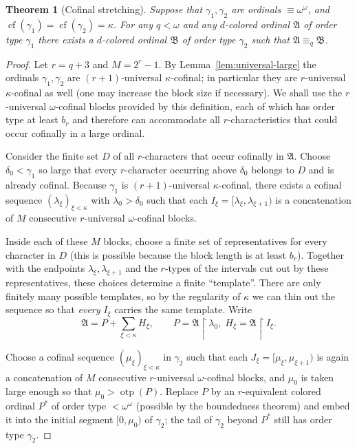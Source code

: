 \documentclass{amsart}
\newcommand{\cf}{\operatorname{cf}}
\newtheorem{theorem}{Theorem}
\theoremstyle{definition}
\begin{document}
\begin{theorem}[Cofinal stretching]\label{lem:cofinal-stretching}
    Suppose that $\gamma_1,\gamma_2$ are ordinals $\equiv\omega^\omega$, and $\cf(\gamma_1)=\cf(\gamma_2)=\kappa$. For any $q<\omega$ and any $d$-colored ordinal $\mathfrak{A}$ of order type $\gamma_1$ there exists a $d$-colored ordinal $\mathfrak{B}$ of order type $\gamma_2$ such that $\mathfrak{A}\equiv_q\mathfrak{B}$.
\end{theorem}
\begin{proof}
    Let $r = q+3$ and $M = 2^r-1$. By Lemma~\ref{lem:universal-large} the ordinals $\gamma_1,\gamma_2$ are $(r+1)$-universal $\kappa$-cofinal; in particular they are $r$-universal $\kappa$-cofinal as well (one may increase the block size if necessary).  We shall use the $r$-universal $\omega$-cofinal blocks provided by this definition, each of which has order type at least $b_r$ and therefore can accommodate all $r$-characteristics that could occur cofinally in a large ordinal.

    Consider the finite set $D$ of all $r$-characters that occur cofinally in $\mathfrak{A}$. Choose $\delta_0<\gamma_1$ so large that every $r$-character occurring above $\delta_0$ belongs to $D$ and is already cofinal.  Because $\gamma_1$ is $(r+1)$-universal $\kappa$-cofinal, there exists a cofinal sequence $(\lambda_\xi)_{\xi<\kappa}$ with $\lambda_0>\delta_0$ such that each $I_\xi = [\lambda_\xi,\lambda_{\xi+1})$ is a concatenation of $M$ consecutive $r$-universal $\omega$-cofinal blocks.

    Inside each of these $M$ blocks, choose a finite set of representatives for every character in $D$ (this is possible because the block length is at least $b_r$). Together with the endpoints $\lambda_\xi,\lambda_{\xi+1}$ and the $r$-types of the intervals cut out by these representatives, these choices determine a finite ``template''. There are only finitely many possible templates, so by the regularity of $\kappa$ we can thin out the sequence so that \emph{every} $I_\xi$ carries the same template. Write
    $$\mathfrak{A} = P + \sum_{\xi<\kappa} H_\xi,\qquad P = \mathfrak{A}\restriction\lambda_0,\;H_\xi = \mathfrak{A}\restriction I_\xi.$$

    Choose a cofinal sequence $(\mu_\xi)_{\xi<\kappa}$ in $\gamma_2$ such that each $J_\xi = [\mu_\xi,\mu_{\xi+1})$ is again a concatenation of $M$ consecutive $r$-universal $\omega$-cofinal blocks, and $\mu_0$ is taken large enough so that $\mu_0 >\operatorname{otp}(P)$.  Replace $P$ by an $r$-equivalent colored ordinal $P^*$ of order type $<\omega^\omega$ (possible by the boundedness theorem) and embed it into the initial segment $[0,\mu_0)$ of $\gamma_2$; the tail of $\gamma_2$ beyond $P^*$ still has order type $\gamma_2$.


\end{proof}
\end{document}
